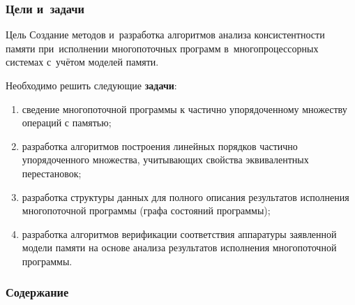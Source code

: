 \begin{frame}
  \frametitle{Цели и~задачи}
  \vspace{-10pt}
  \begin{block}{Цель}
    Создание методов и~разработка алгоритмов анализа консистентности
    памяти при~исполнении многопоточных программ в~многопроцессорных
    системах с~учётом моделей памяти.
  \end{block}
  Необходимо решить следующие \textcolor{accentBlue}{\textbf{задачи}}:
  \begin{enumerate}
    \item сведение многопоточной программы к частично упорядоченному
      множеству операций с памятью;
    \item разработка алгоритмов построения линейных порядков
      частично упорядоченного множества, учитывающих свойства
      эквивалентных перестановок;
    \item разработка структуры данных для полного описания результатов
      исполнения многопоточной программы (графа состояний программы);
    \item разработка алгоритмов верификации соответствия аппаратуры
      заявленной модели памяти на основе анализа результатов исполнения
      многопоточной программы.
  \end{enumerate}
\end{frame}

\begin{frame}
  \frametitle{Содержание}
  \tableofcontents
\end{frame}
